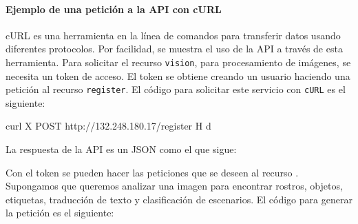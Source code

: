 \paragraph{Ejemplo de una petición a la API con cURL}

cURL es una herramienta en la línea de comandos para transferir
datos usando diferentes protocolos. Por facilidad,
se muestra el uso de la API a través de esta herramienta.
Para solicitar el recurso \texttt{vision}, para procesamiento de imágenes,  se necesita un token de acceso. El token
se obtiene creando un usuario haciendo una petición al recurso
\texttt{register}. El código para solicitar este servicio con
\texttt{cURL} es el siguiente:

%
\begin{sphinxVerbatim}[commandchars=\\\{\}]
curl \PYGZhy{}X POST 
http://132.248.180.17/register 
\PYGZhy{}H 
\PYGZhy{}d 
\end{sphinxVerbatim}

La respuesta de la API es un JSON como el que sigue:

%
\begin{sphinxVerbatim}[commandchars=\\\{\}]
     
     
\end{sphinxVerbatim}

Con el token se pueden hacer las peticiones que se deseen al recurso
. Supongamos que queremos analizar una imagen para encontrar rostros, objetos, etiquetas, traducción 
de texto y clasificación de escenarios. El código para generar la 
petición es el siguiente:

